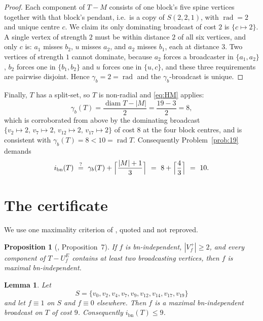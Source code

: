 \documentclass[11pt]{amsart}
\newtheorem{proposition}[theorem]{Proposition}
\newtheorem{lemma}[theorem]{Lemma}
\theoremstyle{definition}
\DeclareMathOperator{\diam}{diam}
\DeclareMathOperator{\rad}{rad}
\newcommand{\ibn}{i_{\mathrm{bn}}}
\newcommand{\gb}{\gamma_{b}}
\begin{document}
\begin{proof}
Each component of $T-M$ consists of one block's five spine vertices together
with that block's pendant, i.e.\ is a copy of $S(2,2,1)$, with $\rad=2$ and
unique centre $c$. We claim its only dominating broadcast of cost $2$ is
$\{c\mapsto 2\}$. A single vertex of strength $2$ must be within distance $2$ of
all six vertices, and only $c$ is: $a_1$ misses $b_2$, $u$ misses $a_2$, and
$a_2$ misses $b_1$, each at distance $3$. Two vertices of strength $1$ cannot
dominate, because $a_2$ forces a broadcaster in $\{a_1,a_2\}$, $b_2$ forces one
in $\{b_1,b_2\}$ and $u$ forces one in $\{u,c\}$, and these three requirements
are pairwise disjoint. Hence $\gb=2=\rad$ and the $\gb$-broadcast is unique.
\end{proof}

Finally, $T$ has a split-set, so $T$ is non-radial and \eqref{eq:HM} applies:
\begin{equation}\label{eq:gb}
  \gb(T)=\frac{\diam T-|M|}{2}=\frac{19-3}{2}=8 ,
\end{equation}
which is corroborated from above by the dominating broadcast
$\{v_2\mapsto 2,\,v_7\mapsto 2,\,v_{12}\mapsto 2,\,v_{17}\mapsto 2\}$ of cost
$8$ at the four block centres, and is consistent with $\gb(T)=8<10=\rad T$.
Consequently Problem~\ref{prob:19} demands
\begin{equation}\label{eq:pred}
  \ibn(T)\ \overset{?}{=}\ \gb(T)+\Bigl\lceil\frac{|M|+1}{3}\Bigr\rceil
  \ =\ 8+\Bigl\lceil\frac{4}{3}\Bigr\rceil\ =\ 10 .
\end{equation}
\section{The certificate}\label{sec:cert}

We use one maximality criterion of \cite{MM2024}, quoted and not reproved.

\begin{proposition}[\cite{MM2024}, Proposition~7]\label{prop:crit}
If $f$ is bn-independent, $|V_f^{+}|\ge 2$, and every component of $T-U_f^{E}$
contains at least two broadcasting vertices, then $f$ is maximal bn-independent.
\end{proposition}

\begin{lemma}\label{lem:witnessA}
Let
\[
  S=\{v_0,v_2,v_4,v_7,v_9,v_{12},v_{14},v_{17},v_{19}\}
\]
and let $f\equiv 1$ on $S$ and $f\equiv 0$ elsewhere. Then $f$ is a maximal
bn-independent broadcast on $T$ of cost $9$. Consequently $\ibn(T)\le 9$.
\end{lemma}
\end{document}
